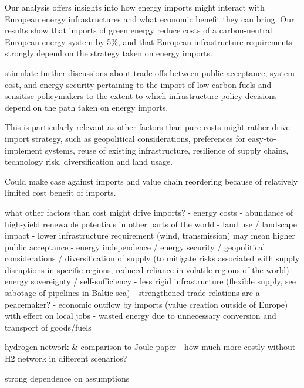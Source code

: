 
Our analysis offers insights into how energy imports might interact with
European energy infrastructures and what economic benefit they can bring. Our
results show that imports of green energy reduce costs of a carbon-neutral
European energy system by 5\%, and that European infrastructure requirements
strongly depend on the strategy taken on energy imports.

stimulate further discussions about
trade-offs between public acceptance, system cost, and energy security
pertaining to the import of low-carbon fuels and sensitise policymakers to the
extent to which infrastructure policy decisions depend on the path taken on
energy imports.

This is particularly relevant as other factors than pure costs
might rather drive import strategy, such as geopolitical considerations,
preferences for easy-to-implement systems, reuse of existing infrastructure,
resilience of supply chains, technology risk, diversification and land usage.

Could make case against imports and value chain reordering because of
relatively limited cost benefit of imports.

what other factors than cost might drive imports?
- energy costs
- abundance of high-yield renewable potentials in other parts of the world
- land use / landscape impact
- lower infrastructure requirement (wind, transmission) may mean higher public acceptance
- energy independence / energy security / geopolitical considerations / diversification of supply (to mitigate risks associated with supply disruptions in specific regions, reduced reliance in volatile regions of the world)
- energy sovereignty / self-sufficiency
- less rigid infrastructure (flexible supply, see sabotage of pipelines in Baltic sea)
- strengthened trade relations are a peacemaker?
- economic outflow by imports (value creation outside of Europe) with effect on local jobs
- wasted energy due to unnecessary conversion and transport of goods/fuels

hydrogen network \& comparison to Joule paper
- how much more costly without H2 network in different scenarios?

strong dependence on assumptions



